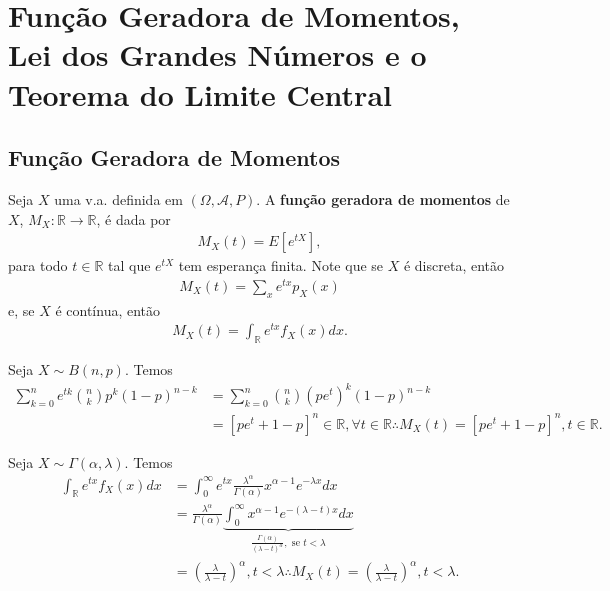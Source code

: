 \documentclass[../Notas.tex]{subfiles}
\begin{document}
\section{Função Geradora de Momentos, Lei dos Grandes Números e o Teorema do Limite Central}

\subsection{Função Geradora de Momentos}
\begin{definition}
Seja $X$ uma v.a. definida em $(\Omega, \mathcal{A}, P)$. A \textbf{função geradora de momentos} de $X$, $M_X:\mathbb{R}\to\mathbb{R}$, é dada por
\begin{align*}
    M_X(t) = E[e^{tX}],
\end{align*}
para todo $t\in\mathbb{R}$ tal que $e^{tX}$ tem esperança finita. Note que se $X$ é discreta, então
\begin{align*}
    M_X(t) = \sum_x e^{tx}p_X(x)
\end{align*}
e, se $X$ é contínua, então
\begin{align*}
    M_X(t) = \int_{\mathbb{R}} e^{tx}f_X(x) dx.
\end{align*}
\end{definition}

\begin{example}
Seja $X\sim B(n,p)$. Temos
\begin{align*}
    \sum_{k=0}^{n} e^{tk}\binom{n}{k}p^k(1-p)^{n-k} &= \sum_{k=0}^{n} \binom{n}{k}(pe^t)^k(1-p)^{n-k} \\
    &= [ pe^t + 1 - p ]^n\in\mathbb{R}, \forall t\in\mathbb{R} \therefore M_X(t) = [ pe^t + 1 - p ]^n, t\in\mathbb{R}.
\end{align*}
\end{example}

\begin{example}
Seja $X\sim\Gamma(\alpha, \lambda)$. Temos
\begin{align*}
    \int_{\mathbb{R}} e^{tx}f_X(x) dx &= \int_{0}^{\infty} e^{tx}\frac{\lambda^{\alpha}}{\Gamma(\alpha)}x^{\alpha - 1}e^{-\lambda x} dx \\
    &= \frac{\lambda^{\alpha}}{\Gamma(\alpha)} \underbrace{\int_{0}^{\infty} x^{\alpha - 1}e^{-(\lambda - t)x} dx}_{\frac{\Gamma(\alpha)}{(\lambda - t)^{\alpha}}, \text{ se } t<\lambda} \\
    &= \left( \frac{\lambda}{\lambda - t} \right)^{\alpha}, t < \lambda \therefore M_X(t) = \left( \frac{\lambda}{\lambda - t} \right)^{\alpha}, t < \lambda.
\end{align*}
\end{example}
\end{document}
